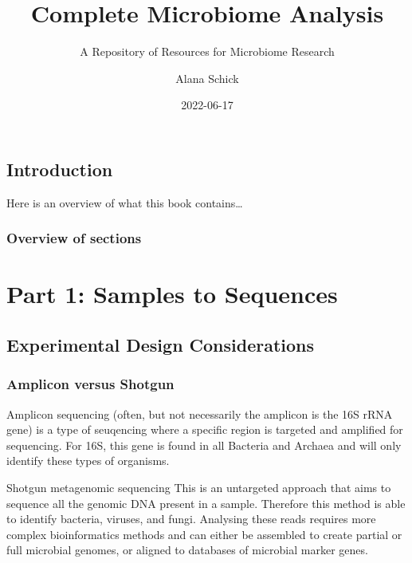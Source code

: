 \documentclass[
]{book}
\title{Complete Microbiome Analysis}
\subtitle{A Repository of Resources for Microbiome Research}
\author{Alana Schick}
\date{2022-06-17}
\begin{document}
\maketitle

{
\setcounter{tocdepth}{1}
\tableofcontents
}
\hypertarget{introduction}{%
\chapter*{Introduction}\label{introduction}}

Here is an overview of what this book contains\ldots{}

\hypertarget{overview-of-sections}{%
\section*{Overview of sections}\label{overview-of-sections}}

\hypertarget{part-part-1-samples-to-sequences}{%
\part{Part 1: Samples to Sequences}\label{part-part-1-samples-to-sequences}}

\hypertarget{experimental-design-considerations}{%
\chapter{Experimental Design Considerations}\label{experimental-design-considerations}}

\hypertarget{amplicon-versus-shotgun}{%
\section{Amplicon versus Shotgun}\label{amplicon-versus-shotgun}}

Amplicon sequencing (often, but not necessarily the amplicon is the 16S rRNA gene) is a type of seuqencing where a specific region is targeted and amplified for sequencing. For 16S, this gene is found in all Bacteria and Archaea and will only identify these types of organisms.

Shotgun metagenomic sequencing
This is an untargeted approach that aims to sequence all the genomic DNA present in a sample. Therefore this method is able to identify bacteria, viruses, and fungi. Analysing these reads requires more complex bioinformatics methods and can either be assembled to create partial or full microbial genomes, or aligned to databases of microbial marker genes.
\end{document}
